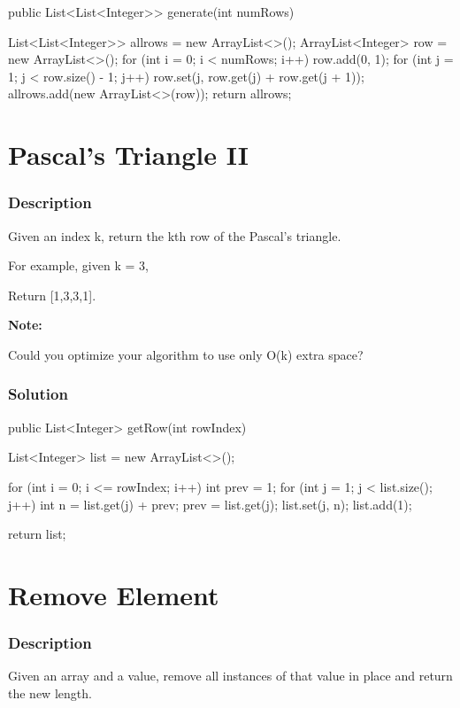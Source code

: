 \begin{Code}
public List<List<Integer>> generate(int numRows) {
    List<List<Integer>> allrows = new ArrayList<>();
    ArrayList<Integer> row = new ArrayList<>();
    for (int i = 0; i < numRows; i++) {
        row.add(0, 1);
        for (int j = 1; j < row.size() - 1; j++)
            row.set(j, row.get(j) + row.get(j + 1));
        allrows.add(new ArrayList<>(row));
    }
    return allrows;

}
\end{Code}

\newpage

\section{Pascal's Triangle II} %

\subsubsection{Description}
Given an index k, return the kth row of the Pascal's triangle.

For example, given k = 3,

Return [1,3,3,1].

\textbf{Note:}

Could you optimize your algorithm to use only O(k) extra space?

\subsubsection{Solution}

\begin{Code}
public List<Integer> getRow(int rowIndex) {
    List<Integer> list = new ArrayList<>();

    for (int i = 0; i <= rowIndex; i++) {
        int prev = 1;
        for (int j = 1; j < list.size(); j++) {
            int n = list.get(j) + prev;
            prev = list.get(j);
            list.set(j, n);
        }
        list.add(1);
    }

    return list;
}
\end{Code}

\newpage

\section{Remove Element} %

\subsubsection{Description}
Given an array and a value, remove all instances of that value in place and return the new length.

